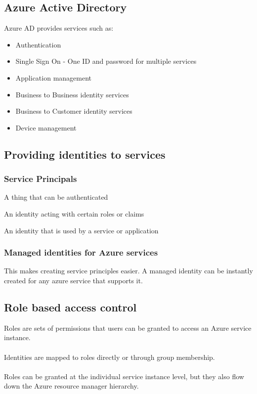 \documentclass{article}[18pt]
\begin{document}
\subsection{Azure Active Directory}
Azure AD provides services such as:
\begin{itemize}
	\item Authentication
	\item Single Sign On - One ID and password for multiple services
	\item Application management
	\item Business to Business identity services
	\item Business to Customer identity services
	\item Device management
\end{itemize}
\subsection{Providing identities to services}
\subsubsection{Service Principals}
\begin{definition}[Identity]
	A thing that can be authenticated
\end{definition}
\begin{definition}[Principal]
	An identity acting with certain roles or claims
\end{definition}
\begin{definition}
	An identity that is used by a service or application
\end{definition}
\subsubsection{Managed identities for Azure services}
This makes creating service principles easier. A managed identity can be instantly created for any azure service that supports it. 
\subsection{Role based access control}
Roles are sets of permissions that users can be granted to access an Azure service instance.\\
\\
Identities are mapped to roles directly or through group membership.\\
\\
Roles can be granted at the individual service instance level, but they also flow down the Azure resource manager hierarchy.
\end{document}
